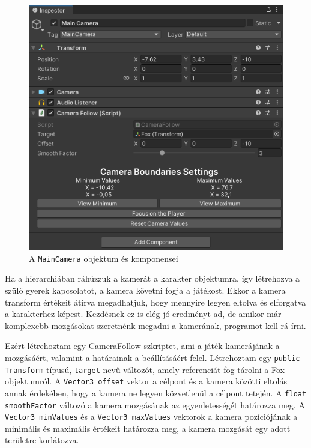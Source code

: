\begin{figure}[ht]
\centering
\includegraphics[scale = 0.6]{images/maincameracomponents.png}
\caption{A \texttt{MainCamera} objektum és komponensei}
\label{fig:maincamera}
\end{figure}

Ha a hierarchiában ráhúzzuk a kamerát a karakter objektumra, így létrehozva a szülő gyerek kapcsolatot, a kamera követni fogja a játékost. Ekkor a kamera transform értékeit átírva megadhatjuk, hogy mennyire legyen eltolva és elforgatva a karakterhez képest. Kezdésnek ez is elég jó eredményt ad, de amikor már komplexebb mozgásokat szeretnénk megadni a kamerának, programot kell rá írni.

Ezért létrehoztam egy CameraFollow szkriptet, ami a játék kamerájának a mozgásáért, valamint a határainak a beállításáért felel. Létrehoztam egy \texttt{public Transform} típusú, \texttt{target} nevű változót, amely referenciát fog tárolni a Fox objektumról. A \texttt{Vector3 offset} vektor a célpont és a kamera közötti eltolás annak érdekében, hogy a kamera ne legyen közvetlenül a célpont tetején. A \texttt{float smoothFactor} változó a kamera mozgásának az egyenletességét határozza meg. A \texttt{Vector3 minValues} és a \texttt{Vector3 maxValues} vektorok a kamera pozíciójának a minimális és maximális értékeit határozza meg, a kamera mozgását egy adott területre korlátozva. 

